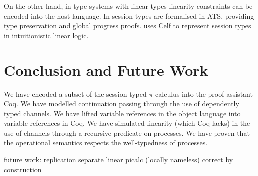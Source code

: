 \documentclass{mproj}
\newcommand{\picalc}{$\pi$-calculus}
\begin{document}
On the other hand, in type systems with linear types linearity constraints can be encoded into the host language. In \cite{Xi2016} session types are formalised in ATS, providing type preservation and global progress proofs. \cite{Bock2016} uses Celf to represent session types in intuitionistic linear logic.

\chapter{Conclusion and Future Work}\label{conclusion}

We have encoded a subset of the session-typed \picalc{} into the proof assistant Coq. We have modelled continuation passing through the use of dependently typed channels. We have lifted variable references in the object language into variable references in Coq. We have simulated linearity (which Coq lacks) in the use of channels through a recursive predicate on processes. We have proven that the operational semantics respects the well-typedness of processes.

\todo{}
future work:
replication
separate linear picalc (locally nameless)
correct by construction

\small


\end{document}
